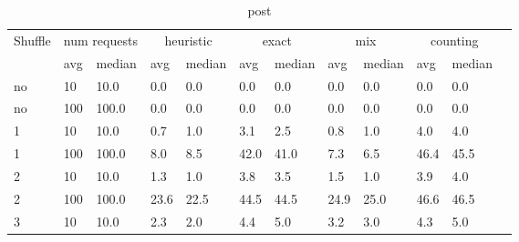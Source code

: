 \documentclass[a4paper]{report}
\begin{document}
\begin{table}[h]
	\centering
	\caption{post}
	\label{tab:get}
	\begin{tabular}{|l|l|l|l|l|l|l|l|l|l|l|l|}
		\hline
		\multirow{2}{*}{Shuffle} & \multicolumn{2}{|c|}{num requests} & \multicolumn{2}{|c|}{heuristic} & \multicolumn{2}{|c|}{exact} & \multicolumn{2}{|c|}{mix} & \multicolumn{2}{|c|}{counting}                                          \\ \cline{2-11}
		                         & avg                                & median                          & avg                         & median                    & avg                            & median & avg  & median & avg  & median \\ \hline
		no                       & 10                                 & 10.0                            & 0.0                         & 0.0                       & 0.0                            & 0.0    & 0.0  & 0.0    & 0.0  & 0.0    \\ \hline
		no                       & 100                                & 100.0                           & 0.0                         & 0.0                       & 0.0                            & 0.0    & 0.0  & 0.0    & 0.0  & 0.0    \\ \hline
		1                        & 10                                 & 10.0                            & 0.7                         & 1.0                       & 3.1                            & 2.5    & 0.8  & 1.0    & 4.0  & 4.0    \\ \hline
		1                        & 100                                & 100.0                           & 8.0                         & 8.5                       & 42.0                           & 41.0   & 7.3  & 6.5    & 46.4 & 45.5   \\ \hline
		2                        & 10                                 & 10.0                            & 1.3                         & 1.0                       & 3.8                            & 3.5    & 1.5  & 1.0    & 3.9  & 4.0    \\ \hline
		2                        & 100                                & 100.0                           & 23.6                        & 22.5                      & 44.5                           & 44.5   & 24.9 & 25.0   & 46.6 & 46.5   \\ \hline
		3                        & 10                                 & 10.0                            & 2.3                         & 2.0                       & 4.4                            & 5.0    & 3.2  & 3.0    & 4.3  & 5.0    \\ \hline

\end{tabular}
\end{table}
\end{document}
